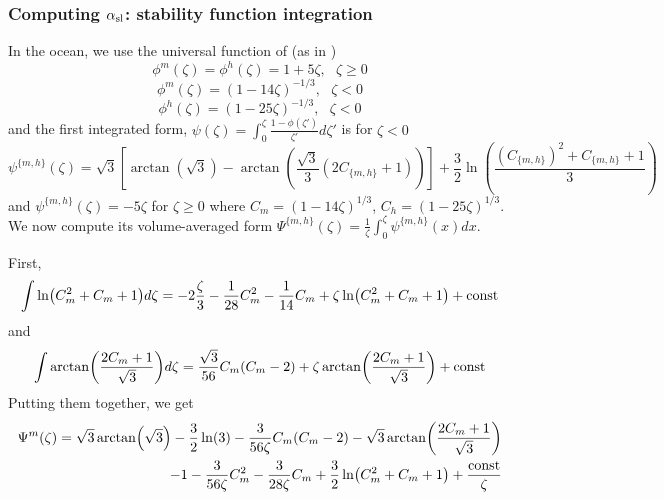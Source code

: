 \subsubsection{Computing $\alpha_{\rm sl}$: stability function integration }
\label{sec:ND_Ocean_stabilityFunctionIntegration}
In the ocean, we use the universal function of \citep{large_similarity_2019} (as in \citep{pelletier_two-sided_2021})
\begin{equation}
	\phi^m(\zeta) = \phi^h(\zeta) = 1+5\zeta, ~~~ \zeta \geq 0
\end{equation}
\begin{equation}
	\phi^m(\zeta) = (1-14\zeta)^{-1/3}, ~~~ \zeta < 0
\end{equation}
\begin{equation}
	\phi^h(\zeta) = (1-25\zeta)^{-1/3}, ~~~ \zeta < 0
\end{equation}
and the first integrated form, $\psi(\zeta)= \int_0^\zeta \frac{1-\phi(\zeta')}{\zeta'}d\zeta'$ is for $\zeta<0$
\begin{equation}
	\psi^{\{m,h\}}(\zeta)  = \sqrt{3}\left[\arctan(\sqrt{3}) -
	\arctan\left(\frac{\sqrt{3}}{3}(2C_{\{m,h\}}+1)\right)\right]
	+ \frac{3}{2}\ln \left(\frac{(C_{\{m,h\}})^2 + C_{\{m,h\}} + 1}{3}\right)
\end{equation}
and $\psi^{\{m,h\}}(\zeta) = -5\zeta$ for $\zeta \geq 0$
where $C_m = (1-14\zeta)^{1/3}$, $C_h = (1-25\zeta)^{1/3}$.
We now compute its volume-averaged form $\Psi^{\{m,h\}}(\zeta)= \frac{1}{\zeta}\int_0^\zeta \psi^{\{m,h\}}(x)dx$.
\par
First,
\begin{equation}
	\int \ln (C_m^2+C_m+1)d\zeta
	= -2 \frac{\zeta}{3} - \frac{1}{28}C_m^2 - \frac{1}{14}C_m
	+\zeta\ln (C_m^2+C_m+1) + {\rm const}
\end{equation}
and
\begin{equation}
	\int \arctan (\frac{2C_m+1}{\sqrt{3}})d\zeta
	= \frac{\sqrt{3}}{56}C_m(C_m-2)
	+ \zeta \arctan (\frac{2C_m+1}{\sqrt{3}}) + {\rm const}
\end{equation}
Putting them together, we get
\begin{equation}
\begin{aligned}
	\Psi^m(\zeta)=\sqrt{3}\arctan(\sqrt{3})- 
	\frac{3}{2}\ln(3) -
	\frac{3}{56\zeta}C_m(C_m-2)
	- \sqrt{3} \arctan (\frac{2C_m+1}{\sqrt{3}})
	\\
	-1 - \frac{3}{56\zeta}C_m^2 - \frac{3}{28\zeta}C_m
	+\frac{3}{2}\ln (C_m^2+C_m+1)
	+ \frac{{\rm const}}{\zeta}
\end{aligned}
\end{equation}
